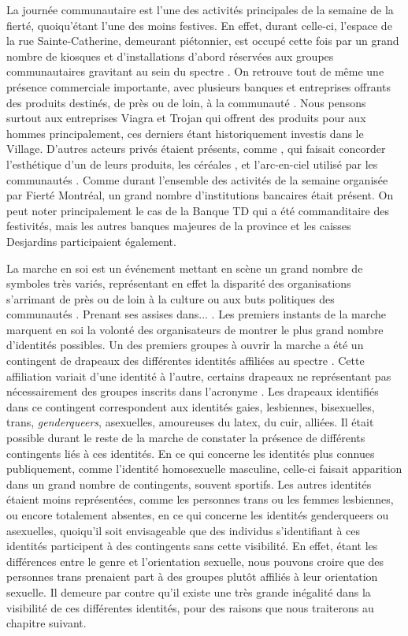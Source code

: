 La journée communautaire est l'une des activités principales de la semaine de la fierté, quoiqu’étant l'une des moins festives.
En effet, durant celle-ci, l'espace de la rue Sainte-Catherine, demeurant piétonnier, est occupé cette fois par un grand nombre de kiosques et d'installations d'abord réservées aux groupes communautaires gravitant au sein du spectre \lgbt.
On retrouve tout de même une présence commerciale importante, avec plusieurs banques et entreprises offrants des produits destinés, de près ou de loin, à la communauté \lgbt.
Nous pensons surtout aux entreprises Viagra et Trojan qui offrent des produits pour aux hommes principalement, ces derniers étant historiquement investis dans le Village.
D'autres acteurs privés étaient présents, comme , qui faisait concorder l'esthétique d'un de leurs produits, les céréales , et l'arc-en-ciel utilisé par les communautés \lgbt.
Comme durant l'ensemble des activités de la semaine organisée par Fierté Montréal, un grand nombre d'institutions bancaires était présent.
On peut noter principalement le cas de la Banque TD qui a été commanditaire des festivités, mais les autres banques majeures de la province et les caisses Desjardins participaient également.

La marche en soi est un événement mettant en scène un grand nombre de symboles très variés, représentant en effet la disparité des organisations s'arrimant de près ou de loin à la culture ou aux buts politiques des communautés \lgbt.
Prenant ses assises dans... .
Les premiers instants de la marche marquent en soi la volonté des organisateurs de montrer le plus grand nombre d'identités possibles.
Un des premiers groupes à ouvrir la marche a été un contingent de drapeaux des différentes identités affiliées au spectre \lgbt{}.
Cette affiliation variait d'une identité à l'autre, certains drapeaux ne représentant pas nécessairement des groupes inscrits dans l'acronyme \lgbt.
Les drapeaux identifiés dans ce contingent correspondent aux identités gaies, lesbiennes, bisexuelles, trans, \emph{genderqueers}, asexuelles, amoureuses du latex, du cuir, alliées.
Il était possible durant le reste de la marche de constater la présence de différents contingents liés à ces identités.
En ce qui concerne les identités plus connues publiquement, comme l'identité homosexuelle masculine, celle-ci faisait apparition dans un grand nombre de contingents, souvent sportifs.
Les autres identités étaient moins représentées, comme les personnes trans ou les femmes lesbiennes, ou encore totalement absentes, en ce qui concerne les identités genderqueers ou asexuelles, quoiqu'il soit envisageable que des individus s'identifiant à ces identités participent à des contingents sans cette visibilité.
En effet, étant les différences entre le genre et l'orientation sexuelle, nous pouvons croire que des personnes trans prenaient part à des groupes plutôt affiliés à leur orientation sexuelle.
Il demeure par contre qu'il existe une très grande inégalité dans la visibilité de ces différentes identités, pour des raisons que nous traiterons au chapitre suivant.

